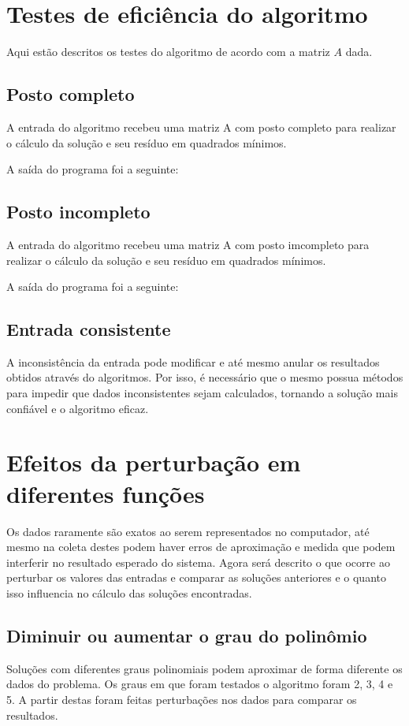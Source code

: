 \chapter{Testes de eficiência do algoritmo}
Aqui estão descritos os testes do algoritmo de acordo com a matriz $A$ dada.

\section{Posto completo}
A entrada do algoritmo recebeu uma matriz A com posto completo para realizar
o cálculo da solução e seu resíduo em quadrados mínimos.

A saída do programa foi a seguinte:
\section{Posto incompleto}

A entrada do algoritmo recebeu uma matriz A com posto imcompleto para realizar
o cálculo da solução e seu resíduo em quadrados mínimos.

A saída do programa foi a seguinte:

\section{Entrada consistente}
A inconsistência da entrada pode modificar e até mesmo anular os resultados
obtidos através do algoritmos. Por isso, é necessário que o mesmo possua 
métodos para impedir que dados inconsistentes sejam calculados, tornando
a solução mais confiável e o algoritmo eficaz.


\chapter{Efeitos da perturbação em diferentes funções}
Os dados raramente são exatos ao serem representados no computador, até mesmo na 
coleta destes podem haver erros de aproximação e medida que podem interferir no
resultado esperado do sistema.
Agora será descrito o que ocorre ao perturbar os valores das entradas e 
comparar as soluções anteriores e o quanto isso influencia no cálculo das 
soluções encontradas.

\section{Diminuir ou aumentar o grau do polinômio}
Soluções com diferentes graus polinomiais podem aproximar de forma diferente
os dados do problema.
Os graus em que foram testados o algoritmo foram 2, 3, 4 e 5.
A partir destas foram feitas perturbações nos dados para comparar os resultados.


